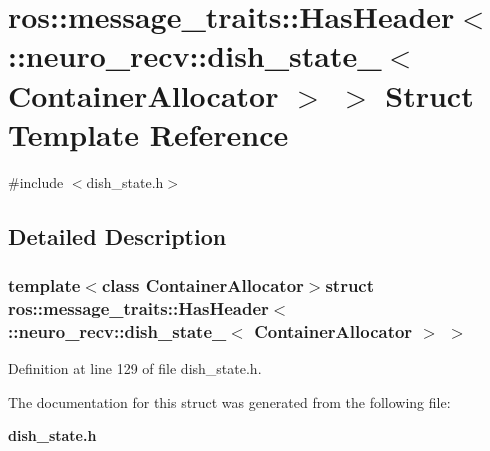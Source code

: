 \section{ros\-:\-:message\-\_\-traits\-:\-:\-Has\-Header$<$ \-:\-:neuro\-\_\-recv\-:\-:dish\-\_\-state\-\_\-$<$ \-Container\-Allocator $>$ $>$ \-Struct \-Template \-Reference}
\label{structros_1_1message__traits_1_1HasHeader_3_01_1_1neuro__recv_1_1dish__state___3_01ContainerAllocator_01_4_01_4}


{\ttfamily \#include $<$dish\-\_\-state.\-h$>$}



\subsection{\-Detailed \-Description}
\subsubsection*{template$<$class Container\-Allocator$>$struct ros\-::message\-\_\-traits\-::\-Has\-Header$<$ \-::neuro\-\_\-recv\-::dish\-\_\-state\-\_\-$<$ Container\-Allocator $>$ $>$}



\-Definition at line 129 of file dish\-\_\-state.\-h.



\-The documentation for this struct was generated from the following file\-:\begin{DoxyCompactItemize}
\item 
{\bf dish\-\_\-state.\-h}\end{DoxyCompactItemize}
